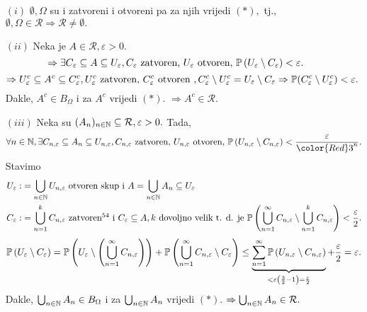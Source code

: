 \documentclass{article}
\begin{document}
\begin{itemize}
    \item[\((i)\)] \(\emptyset,\Omega\) su i zatvoreni i otvoreni pa za njih vrijedi \((*),\) tj., \(\emptyset,\Omega\in\mathcal R\Rightarrow\mathcal R\ne\emptyset.\)
    \item[\((ii)\)] Neka je \(A\in\mathcal R,\varepsilon>0.\) \[\Rightarrow\exists C_\varepsilon\subseteq A\subseteq U_\varepsilon,C_\varepsilon\text{ zatvoren, }U_\varepsilon\text{ otvoren, }\Bbb P\left(U_\varepsilon\setminus C_\varepsilon\right)<\varepsilon.\] \[\Rightarrow U_\varepsilon^c\subseteq A^c\subseteq C_\varepsilon^c,U_\varepsilon^c\text{ zatvoren, }C_\varepsilon^c\text{ otvoren }, C_\varepsilon^c\setminus U_\varepsilon^c=U_\varepsilon\setminus C_\varepsilon\Rightarrow\Bbb P(C_\varepsilon^c\setminus U_\varepsilon^c)<\varepsilon.\] Dakle, \(A^c\in B_\Omega\) i za \(A^c\) vrijedi \((*).\) \(\Rightarrow A^c\in\mathcal R.\)
    \item[\((iii)\)] Neka su \((A_n)_{n\in\Bbb N}\subseteq\mathcal R,\varepsilon>0.\) Tada, \[\forall n\in\Bbb N,\exists C_{n,\varepsilon}\subseteq A_n\subseteq U_{n,\varepsilon},C_{n,\varepsilon}\text{ zatvoren, }U_{n,\varepsilon}\text{ otvoren, }\Bbb P\left(U_{n,\varepsilon}\setminus C_{n,\varepsilon}\right)<\frac\varepsilon{{\color{Red}3}^n}.\] Stavimo \[\begin{aligned}U_\varepsilon:&=\bigcup_{n\in\Bbb N}U_{n,\varepsilon}\text{ otvoren skup i }A=\bigcup_{n\in\Bbb N}A_n\subseteq U_\varepsilon\\C_\varepsilon:&=\bigcup_{n=1}^kC_{n,\varepsilon}\text{ zatvoren}\footnotemark[54]\text{ i }C_\varepsilon\subseteq A,k\text{ dovoljno velik t. d. je }\Bbb P\left(\bigcup_{n=1}^\infty C_{n,\varepsilon}\setminus\bigcup_{n=1}^k C_{n,\varepsilon}\right)<\frac\varepsilon2.\end{aligned}\] \[\Bbb P\left(U_\varepsilon\setminus C_\varepsilon\right)=\Bbb P\left(U_\varepsilon\setminus\left(\bigcup_{n=1}^\infty C_{n,\varepsilon}\right)\right)+\Bbb P\left(\bigcup_{n=1}^\infty C_{n,\varepsilon}\setminus C_\varepsilon\right)\le\underbrace{\sum_{n=1}^\infty\Bbb P\left(U_{n,\varepsilon}\setminus C_{n,\varepsilon}\right)}_{<\varepsilon\left(\frac32-1\right)=\frac\varepsilon2}+\frac\varepsilon2=\varepsilon.\] Dakle, \(\bigcup_{n\in\Bbb N}A_n\in B_\Omega\) i za \(\bigcup_{n\in\Bbb N}A_n\) vrijedi \((*).\) \(\Rightarrow\bigcup_{n\in\Bbb N}A_n\in\mathcal R.\)

\end{itemize}
\end{document}
